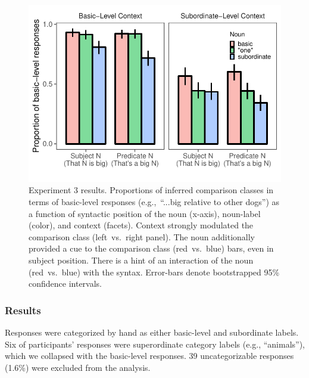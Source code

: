 \documentclass[10pt,letterpaper]{article}
\begin{document}
\begin{figure}[t]
	\begin{center}
		\includegraphics[width=\linewidth]{expt3-cc-inference-revised.pdf}
	\end{center}
	\caption{Experiment 3 results. Proportions of inferred comparison classes in terms of basic-level responses (e.g.,~“...big relative to other dogs”) as a function of syntactic position of the noun (x-axis), noun-label (color), and context (facets).
	Context strongly modulated the comparison class (left~vs.~right panel). 
	The noun additionally provided a cue to the comparison class (red~vs.~blue) bars, even in subject position. 
	There is a hint of an interaction of the noun (red~vs.~blue) with the syntax. 
	Error-bars denote bootstrapped 95\% confidence intervals.
	}
	\label{cc-inference}
\end{figure}

\subsubsection{Results} 
Responses were categorized by hand as either basic-level and subordinate labels. 
Six of participants' responses were superordinate category labels (e.g., ``animals''), which we collapsed with the basic-level responses. 
39 uncategorizable responses (1.6\%) were excluded from the analysis. 
\end{document}
